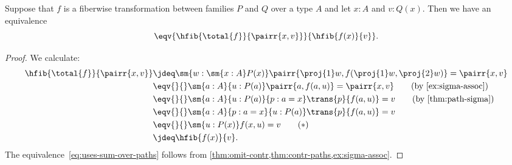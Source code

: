 %
\begin{thm}\label{fibwise-fiber-total-fiber-equiv}
Suppose that $f$ is a fiberwise transformation between families $P$ and
$Q$ over a type $A$ and let $x:A$ and $v:Q(x)$. Then we have an equivalence
\begin{equation*}
\eqv{\hfib{\total{f}}{\pairr{x,v}}}{\hfib{f(x)}{v}}.
\end{equation*}
\end{thm}

\begin{proof}
  We calculate:
\begin{align}
  \hfib{\total{f}}{\pairr{x,v}}
  & \jdeq \sm{w:\sm{x:A}P(x)}\pairr{\proj{1}w,f(\proj{1}w,\proj{2}w)}=\pairr{x,v}
  \notag \\
  & \eqv{}{} \sm{a:A}{u:P(a)}\pairr{a,f(a,u)}=\pairr{x,v}
  \tag{by~\cref{ex:sigma-assoc}} \\
  & \eqv{}{} \sm{a:A}{u:P(a)}{p:a=x}\trans{p}{f(a,u)}=v
  \tag{by \cref{thm:path-sigma}} \\
  & \eqv{}{} \sm{a:A}{p:a=x}{u:P(a)}\trans{p}{f(a,u)}=v
  \notag \\
  & \eqv{}{} \sm{u:P(x)}f(x,u)=v
  \tag{$*$}\label{eq:uses-sum-over-paths} \\
  & \jdeq \hfib{f(x)}{v}. \notag
\end{align}
The equivalence~\eqref{eq:uses-sum-over-paths} follows from \cref{thm:omit-contr,thm:contr-paths,ex:sigma-assoc}.
\end{proof}
